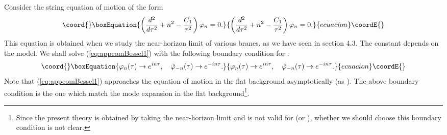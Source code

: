 \documentclass[a4paper,12pt]{article}
\begin{document}
Consider the string equation of motion of the form
\begin{equation}\coord{}\boxEquation{
\left({d^2\over d\tau^2}+n^2
- {C_{1}\over \tau^{2}} \right)\varphi_{n}=0.
\label{eq:appeomBessel1}
}{
\left({d^2\over d\tau^2}+n^2
- {C_{1}\over \tau^{2}} \right)\varphi_{n}=0.
}{ecuacion}\coordE{}\end{equation}
This equation is obtained when we study the near-horizon 
limit of various branes, as we have seen in section 4.3. 
The constant \coordHE{} depends on the model. 
We shall solve (\ref{eq:appeomBessel1})
with the following boundary condition for 
\myHighlight{$\tau\rightarrow\infty$}\coordHE{}:
\begin{equation}\coord{}\boxEquation{
\varphi_{n}(\tau)\rightarrow e^{in\tau},\quad
\tilde{\varphi}_{-n}(\tau)\rightarrow e^{-in\tau}.
\label{eq:assbc}
}{
\varphi_{n}(\tau)\rightarrow e^{in\tau},\quad
\tilde{\varphi}_{-n}(\tau)\rightarrow e^{-in\tau}.
}{ecuacion}\coordE{}\end{equation}
Note that (\ref{eq:appeomBessel1}) approaches the equation
of motion in the flat background asymptotically
(as \myHighlight{$\tau\rightarrow\infty$}\coordHE{}).
The above boundary condition is the one which 
match the mode expansion in the flat background\footnote{Since 
the present theory is obtained
by taking the near-horizon limit and is not valid for 
\coordHE{} (or \myHighlight{$\tau\rightarrow\infty$}\coordHE{}),
whether we should choose this boundary condition is not clear.}.
\end{document}
